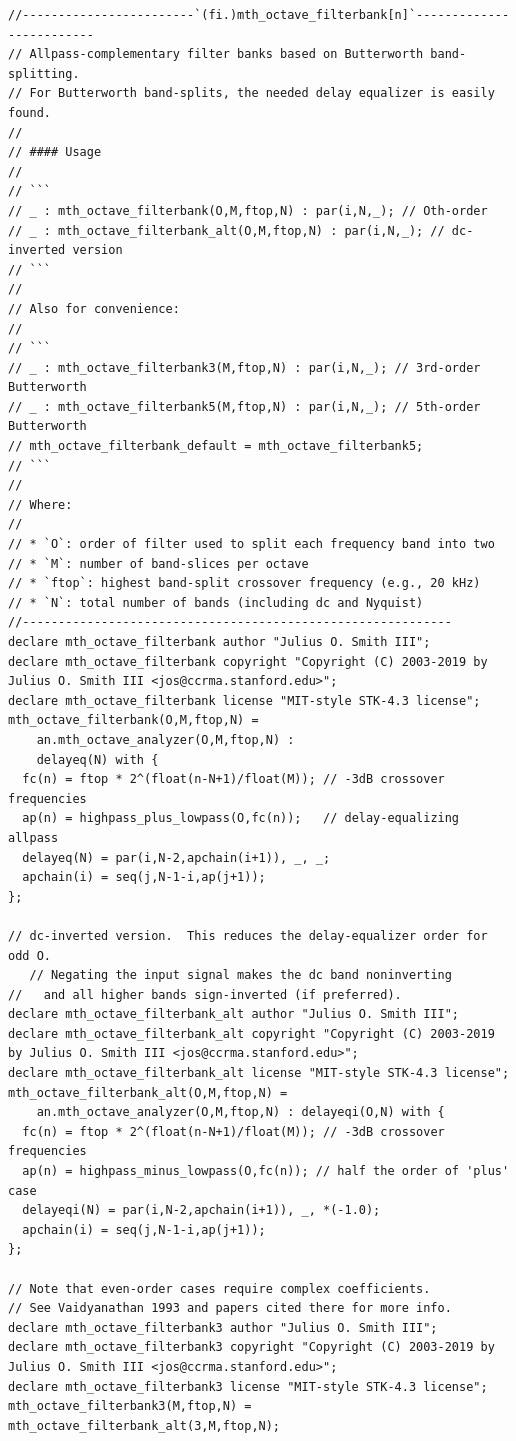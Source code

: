 \documentclass{article}
\begin{document}
\begin{lstlisting}[caption=\texttt{filters.lib}]
//------------------------`(fi.)mth_octave_filterbank[n]`-------------------------
// Allpass-complementary filter banks based on Butterworth band-splitting.
// For Butterworth band-splits, the needed delay equalizer is easily found.
//
// #### Usage
//
// ```
// _ : mth_octave_filterbank(O,M,ftop,N) : par(i,N,_); // Oth-order
// _ : mth_octave_filterbank_alt(O,M,ftop,N) : par(i,N,_); // dc-inverted version
// ```
//
// Also for convenience:
//
// ```
// _ : mth_octave_filterbank3(M,ftop,N) : par(i,N,_); // 3rd-order Butterworth
// _ : mth_octave_filterbank5(M,ftop,N) : par(i,N,_); // 5th-order Butterworth
// mth_octave_filterbank_default = mth_octave_filterbank5;
// ```
//
// Where:
//
// * `O`: order of filter used to split each frequency band into two
// * `M`: number of band-slices per octave
// * `ftop`: highest band-split crossover frequency (e.g., 20 kHz)
// * `N`: total number of bands (including dc and Nyquist)
//------------------------------------------------------------
declare mth_octave_filterbank author "Julius O. Smith III";
declare mth_octave_filterbank copyright "Copyright (C) 2003-2019 by Julius O. Smith III <jos@ccrma.stanford.edu>";
declare mth_octave_filterbank license "MIT-style STK-4.3 license";
mth_octave_filterbank(O,M,ftop,N) =
    an.mth_octave_analyzer(O,M,ftop,N) :
    delayeq(N) with {
  fc(n) = ftop * 2^(float(n-N+1)/float(M)); // -3dB crossover frequencies
  ap(n) = highpass_plus_lowpass(O,fc(n));   // delay-equalizing allpass
  delayeq(N) = par(i,N-2,apchain(i+1)), _, _;
  apchain(i) = seq(j,N-1-i,ap(j+1));
};

// dc-inverted version.  This reduces the delay-equalizer order for odd O.
   // Negating the input signal makes the dc band noninverting
//   and all higher bands sign-inverted (if preferred).
declare mth_octave_filterbank_alt author "Julius O. Smith III";
declare mth_octave_filterbank_alt copyright "Copyright (C) 2003-2019 by Julius O. Smith III <jos@ccrma.stanford.edu>";
declare mth_octave_filterbank_alt license "MIT-style STK-4.3 license";
mth_octave_filterbank_alt(O,M,ftop,N) =
    an.mth_octave_analyzer(O,M,ftop,N) : delayeqi(O,N) with {
  fc(n) = ftop * 2^(float(n-N+1)/float(M)); // -3dB crossover frequencies
  ap(n) = highpass_minus_lowpass(O,fc(n)); // half the order of 'plus' case
  delayeqi(N) = par(i,N-2,apchain(i+1)), _, *(-1.0);
  apchain(i) = seq(j,N-1-i,ap(j+1));
};

// Note that even-order cases require complex coefficients.
// See Vaidyanathan 1993 and papers cited there for more info.
declare mth_octave_filterbank3 author "Julius O. Smith III";
declare mth_octave_filterbank3 copyright "Copyright (C) 2003-2019 by Julius O. Smith III <jos@ccrma.stanford.edu>";
declare mth_octave_filterbank3 license "MIT-style STK-4.3 license";
mth_octave_filterbank3(M,ftop,N) = mth_octave_filterbank_alt(3,M,ftop,N);


\end{lstlisting}
\end{document}
